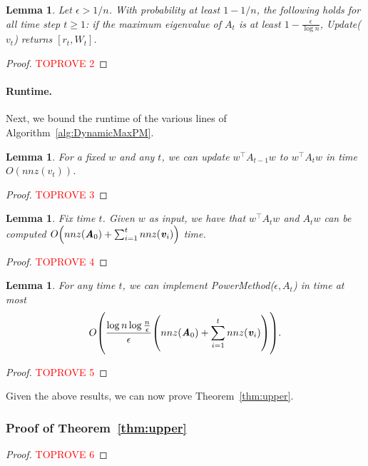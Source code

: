 \documentclass[11pt]{article}
\newtheorem{lemma}[theorem]{Lemma}
\let\originalleft\left
\let\originalright\right
\renewcommand{\left}{\mathopen{}\mathclose\bgroup\originalleft}
\renewcommand{\right}{\aftergroup\egroup\originalright}
\newcommand\vv{\boldsymbol{\mathit{v}}}
\newcommand\ww{\boldsymbol{\mathit{w}}}
\renewcommand\AA{\boldsymbol{\mathit{A}}}
\newcommand\WW{\boldsymbol{\mathit{W}}}
\begin{document}
\begin{lemma}\label{lem:DynCorrectAns}
Let $\epsilon>1/n$. With probability at least $1-1/n$, the following holds for all time step $t \ge 1$: 
if the maximum eigenvalue of $\AA_t$ is at least $1-\frac{\epsilon}{\log n}$, {\sc Update}($\vv_t$) returns $[r_t,\WW_t]$.
\end{lemma}
\begin{proof}\textcolor{red}{TOPROVE 2}\end{proof}



\paragraph{Runtime.}\label{sec:runtime}

Next, we bound the runtime of the various lines of Algorithm~\ref{alg:DynamicMaxPM}. 
\begin{lemma}\label{lem:SameW}
For a fixed $\ww$ and any $t$, we can update $\ww^{\top}\AA_{t-1}\ww$ to $\ww^{\top}\AA_t\ww$ in time $O(nnz(\vv_t))$.
\end{lemma}
\begin{proof}\textcolor{red}{TOPROVE 3}\end{proof}
\begin{lemma}\label{lem:DiffW}
Fix time $t$. Given $\ww$ as input, we have that $\ww^{\top}\AA_t\ww$ and $\AA_t\ww$ can be computed $O\left(nnz(\AA_0) +\sum_{i=1}^t nnz(\vv_i)\right)$ time.
\end{lemma}
\begin{proof}\textcolor{red}{TOPROVE 4}\end{proof}
\begin{lemma}\label{lem:PMt}For any time $t$, we can implement {\sc PowerMethod}($\epsilon,\AA_t$) in time at most 
\[
O\left(\frac{\log n\log \frac{n}{\epsilon}}{\epsilon}\left(nnz(\AA_0) +\sum_{i=1}^t nnz(\vv_i)\right)\right).
\]
\end{lemma}
\begin{proof}\textcolor{red}{TOPROVE 5}\end{proof}

 Given the above results, we can now prove Theorem~\ref{thm:upper}.
\subsubsection*{Proof of Theorem~\ref{thm:upper}}
\begin{proof}\textcolor{red}{TOPROVE 6}\end{proof}
\end{document}
